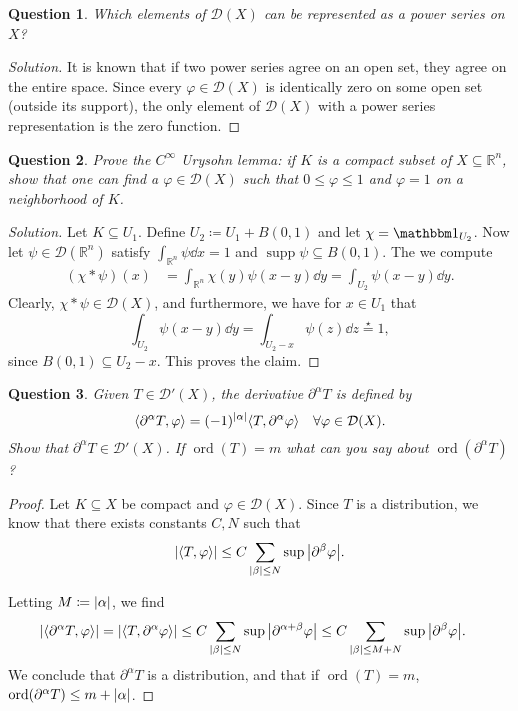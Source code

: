 \documentclass{article}
\theoremstyle{plain}
\newtheorem{question}{Question}
\theoremstyle{remark}
\newenvironment{solution}{\begin{proof}[Solution]\renewcommand\qedsymbol{}}{\end{proof}}
\renewcommand{\phi}{\varphi}
\newcommand{\Bb}{\mathbb}
\newcommand{\Cal}{\mathcal}
\newcommand{\RR}{\Bb R}
\newcommand{\DD}{\Cal D}
\DeclarePairedDelimiter{\ang}{\langle}{\rangle}
\newcommand\ceq\coloneqq %
\newcommand\ind{\mathbbm 1} %
\newcommand\pt\partial
\DeclareMathOperator{\supp}{supp}
\DeclareMathOperator{\ord}{ord}
\begin{document}
\begin{question}
	Which elements of $\DD(X)$ can be represented as a power series on $X$? 
\end{question}

\begin{solution}
	It is known that if two power series agree on an open set, they agree on the entire space. Since every $\phi \in \DD(X)$ is identically zero on some open set (outside its support), the only element of $\DD(X)$ with a power series representation is the zero function. 
\end{solution}

\begin{question}
	Prove the $C^\infty$ Urysohn lemma: if $K$ is a compact subset of $X \subseteq \RR^n$, show that one can find a $\phi \in \DD(X)$ such that $0 \leq \phi \leq 1$ and $\phi = 1$ on a neighborhood of $K$. 
\end{question}

\begin{solution}
	Let $K \subseteq U_1$. Define $U_2 \ceq U_1 + B(0, 1)$ and let $\chi = \ind_{U_2}$. Now let $\psi \in \DD(\RR^n)$ satisfy $\int_{\RR^n} \psi \dd{x} = 1$ and $\supp\psi \subseteq B(0, 1)$. The we compute
	\begin{align*}
		(\chi * \psi)(x) &= \int_{\RR^n} \chi(y) \psi(x - y) \dd{y} = \int_{U_2} \psi(x - y) \dd{y}.
	\end{align*}
	Clearly, $\chi * \psi \in \DD(X)$, and furthermore, we have for $x \in U_1$ that
	\[
	\int_{U_2} \psi(x - y) \dd{y} = \int_{U_2 - x} \psi(z) \dd{z} \overset\star= 1,
	\]
	since $B(0, 1) \subseteq U_2 - x$. This proves the claim.
\end{solution}

\begin{question}
	Given $T \in \DD'(X)$, the derivative $\pt^\alpha T$ is defined by
	\[
	\ang{\pt^\alpha T, \phi} = (-1)^\abs{\alpha} \ang{T, \pt^\alpha\phi} \quad \forall \phi \in \DD(X). 
	\]
	Show that $\pt^\alpha T \in \DD'(X)$. If $\ord(T) = m$ what can you say about $\ord(\pt^\alpha T)$? 
\end{question}

\begin{proof}
	Let $K \subseteq X$ be compact and $\phi \in \DD(X)$. Since $T$ is a distribution, we know that there exists constants $C, N$ such that
	\[
	\abs{\ang{T, \phi}} \leq C \sum_{\abs{\beta} \leq N} \sup \abs{\pt^\beta \phi}. 
	\]
	
	Letting $M \ceq \abs{\alpha}$, we find
		\begin{align*}
		\abs{\ang{\pt^\alpha T, \phi}} &= \abs{\ang{T, \pt^\alpha\phi}} \leq C \sum_{\abs{\beta} \leq N} \sup \abs{\pt^{\alpha + \beta}\phi} \leq C \sum_{\abs{\beta} \leq M + N} \sup \abs{\pt^\beta \phi}.
	\end{align*}
We conclude that $\pt^\alpha T$ is a distribution, and that if $\ord(T) = m$, $\ord(\pt^\alpha T) \leq m + \abs{\alpha}$. 
\end{proof}
\end{document}
